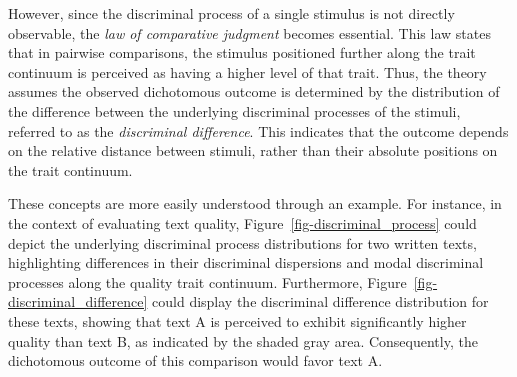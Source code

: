 \documentclass[
  authoryear,
  preprint,
  1p]{elsarticle}
\begin{document}
However, since the discriminal process of a single stimulus is not
directly observable, the \emph{law of comparative judgment} becomes
essential. This law states that in pairwise comparisons, the stimulus
positioned further along the trait continuum is perceived as having a
higher level of that trait. Thus, the theory assumes the observed
dichotomous outcome is determined by the distribution of the difference
between the underlying discriminal processes of the stimuli, referred to
as the \emph{discriminal difference}. This indicates that the outcome
depends on the relative distance between stimuli, rather than their
absolute positions on the trait continuum.

These concepts are more easily understood through an example. For
instance, in the context of evaluating text quality,
Figure~\ref{fig-discriminal_process} could depict the underlying
discriminal process distributions for two written texts, highlighting
differences in their discriminal dispersions and modal discriminal
processes along the quality trait continuum. Furthermore,
Figure~\ref{fig-discriminal_difference} could display the discriminal
difference distribution for these texts, showing that text A is
perceived to exhibit significantly higher quality than text B, as
indicated by the shaded gray area. Consequently, the dichotomous outcome
of this comparison would favor text A.
\end{document}
